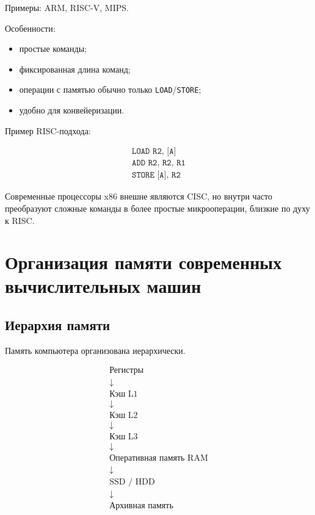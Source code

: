 \documentclass[12pt,a4paper]{article}
\theoremstyle{remark}
\begin{document}
Примеры: ARM, RISC-V, MIPS.

Особенности:
\begin{itemize}
    \item простые команды;
    \item фиксированная длина команд;
    \item операции с памятью обычно только \texttt{LOAD}/\texttt{STORE};
    \item удобно для конвейеризации.
\end{itemize}

Пример RISC-подхода:

\[
\begin{array}{l}
\texttt{LOAD R2, [A]} \\
\texttt{ADD R2, R2, R1} \\
\texttt{STORE [A], R2}
\end{array}
\]

Современные процессоры x86 внешне являются CISC, но внутри часто преобразуют сложные команды в более простые микрооперации, близкие по духу к RISC.

\section{Организация памяти современных вычислительных машин}

\subsection{Иерархия памяти}

Память компьютера организована иерархически.

\[
\begin{array}{c}
\boxed{\text{Регистры}} \\
\downarrow \\
\boxed{\text{Кэш L1}} \\
\downarrow \\
\boxed{\text{Кэш L2}} \\
\downarrow \\
\boxed{\text{Кэш L3}} \\
\downarrow \\
\boxed{\text{Оперативная память RAM}} \\
\downarrow \\
\boxed{\text{SSD / HDD}} \\
\downarrow \\
\boxed{\text{Архивная память}}
\end{array}
\]
\end{document}
